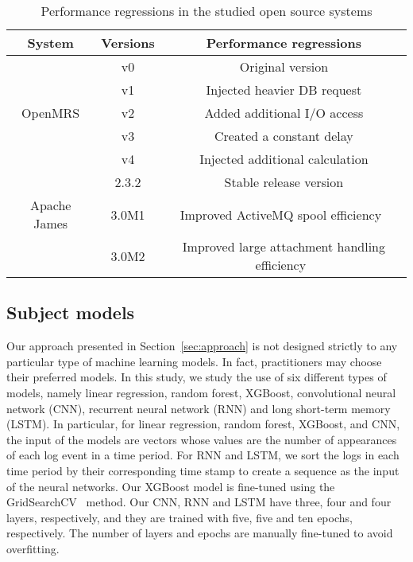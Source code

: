 \begin{table}[tbh]
  \centering
  \caption{Performance regressions in the studied open source systems}
    \begin{tabular}{c|c|p{3.3cm}}
    \hline
    System & Versions & \multicolumn{1}{c}{Performance regressions} \\
    \hline
          & v0    & \multicolumn{1}{c}{Original version} \\
\cline{2-3}          & v1    & \multicolumn{1}{c}{Injected heavier DB request} \\
\cline{2-3}    OpenMRS & v2    & \multicolumn{1}{c}{Added additional I/O access} \\
\cline{2-3}          & v3    & \multicolumn{1}{c}{Created a constant delay} \\
\cline{2-3}          & v4    & \multicolumn{1}{c}{Injected additional calculation} \\
    \hline
          & 2.3.2 & \multicolumn{1}{c}{Stable release version} \\
          \cline{2-3}
          Apache James & 3.0M1 & \multicolumn{1}{c}{Improved ActiveMQ spool efficiency~\citep{Apache-James}} \\
          \cline{2-3}
          & 3.0M2& \multicolumn{1}{c}{Improved large attachment handling efficiency~\citep{Apache-James}} \\
    \hline
    \end{tabular}%
  \label{tab:workloaddeisign}%
\end{table}%



\subsection{Subject models}
Our approach presented in Section~\ref{sec:approach} is not designed strictly to any particular type of machine learning models. In fact, practitioners may choose their preferred models. In this study, we study the use of six different types of models, namely linear regression, random forest, XGBoost, convolutional neural network (CNN), recurrent neural network (RNN) and long short-term memory (LSTM). In particular, for linear regression, random forest, XGBoost, and CNN, the input of the models are vectors whose values are the number of appearances of each log event in a time period. For RNN and LSTM, we sort the logs in each time period by their corresponding time stamp to create a sequence as the input of the neural networks. Our XGBoost model is fine-tuned using the GridSearchCV~\citep{girdsearcv} method. Our CNN, RNN and LSTM have three, four and four layers, respectively, and they are trained with five, five and ten epochs, respectively. The number of layers and epochs are manually fine-tuned to avoid overfitting.
 
